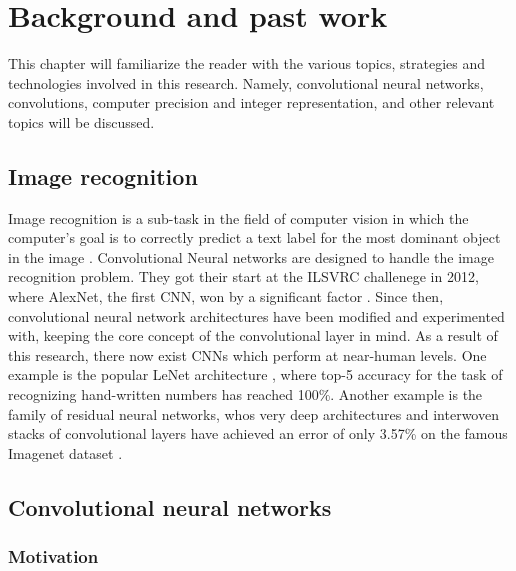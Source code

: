 \chapter{Background and past work}

This chapter will familiarize the reader with the various topics, strategies and technologies involved in this research. Namely, convolutional neural networks, convolutions, computer precision and integer representation, and other relevant topics will be discussed.

\section{Image recognition}
Image recognition is a sub-task in the field of computer vision in which the computer's goal is to correctly predict a text label for the most dominant object in the image \cite{history}. Convolutional Neural networks are designed to handle the image recognition problem. They got their start at the ILSVRC challenege in 2012, where AlexNet, the first CNN, won by a significant factor \cite{history}. Since then, convolutional neural network architectures have been modified and experimented with, keeping the core concept of the convolutional layer in mind. As a result of this research, there now exist CNNs which perform at near-human levels. One example is the popular LeNet architecture \cite{mnist}, where top-5 accuracy for the task of recognizing hand-written numbers has reached 100\%. Another example is the family of residual neural networks, whos very deep architectures and interwoven stacks of convolutional layers have achieved an error of only 3.57\% on the famous Imagenet dataset \cite{resnets2}.

\section{Convolutional neural networks}
\subsection{Motivation}
